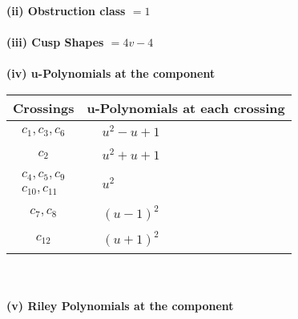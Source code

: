 \documentclass[1p]{elsarticle_modified}
\theoremstyle{definition}
\begin{document}
\flushleft \textbf{(ii) Obstruction class $= 1$}\\~\\
\flushleft \textbf{(iii) Cusp Shapes $= 4 v-4$}\\~\\
\newpage\renewcommand{\arraystretch}{1}
\flushleft \textbf{(iv) u-Polynomials at the component}\newline \\
\begin{tabular}{m{50pt}|m{274pt}}
Crossings & \hspace{64pt}u-Polynomials at each crossing \\
\hline $$\begin{aligned}c_{1},c_{3},c_{6}\end{aligned}$$&$\begin{aligned}
&u^2- u+1
\end{aligned}$\\
\hline $$\begin{aligned}c_{2}\end{aligned}$$&$\begin{aligned}
&u^2+u+1
\end{aligned}$\\
\hline $$\begin{aligned}c_{4},c_{5},c_{9}\\c_{10},c_{11}\end{aligned}$$&$\begin{aligned}
&u^2
\end{aligned}$\\
\hline $$\begin{aligned}c_{7},c_{8}\end{aligned}$$&$\begin{aligned}
&(u-1)^2
\end{aligned}$\\
\hline $$\begin{aligned}c_{12}\end{aligned}$$&$\begin{aligned}
&(u+1)^2
\end{aligned}$\\
\hline
\end{tabular}\\~\\
\newpage\renewcommand{\arraystretch}{1}
\flushleft \textbf{(v) Riley Polynomials at the component}\newline \\
\end{document}

